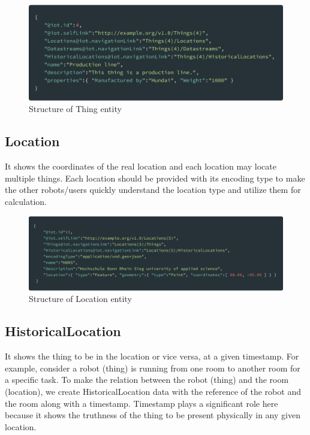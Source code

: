 	\begin{figure}[!htbp] 
		\begin{center}
			\includegraphics[scale=0.1]{./images/png/ogc/thing}	
			\caption{Structure of Thing entity}	
			\label{fig:thing}	
		\end{center}
	\end{figure}

	\subsection{Location}
	It shows the coordinates of the real location and each location may locate multiple things. Each location should be provided with its encoding type to make the other robots/users quickly understand the location type and utilize them for calculation.
	
	\begin{figure}[!htbp] 
		\begin{center}
			\includegraphics[scale=0.1]{./images/png/ogc/location}	
			\caption{Structure of Location entity}	
			\label{fig:location}	
		\end{center}
	\end{figure}

	\subsection{HistoricalLocation}
	It shows the thing to be in the location or vice versa, at a given timestamp. For example, consider a robot (thing) is running from one room to another room for a specific task. To make the relation between the robot (thing) and the room (location), we create HistoricalLocation data with the reference of the robot and the room along with a timestamp. Timestamp plays a significant role here because it shows the truthness of the thing to be present physically in any given location.
	
